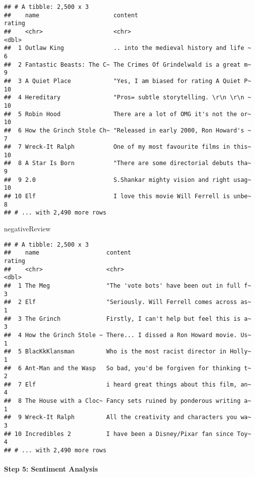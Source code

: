 \documentclass[]{article}
\newenvironment{Shaded}{\begin{snugshade}}{\end{snugshade}}
\newcommand{\NormalTok}[1]{#1}
\let\oldparagraph\paragraph
\renewcommand{\paragraph}[1]{\oldparagraph{#1}\mbox{}}
\begin{document}
\begin{verbatim}
## # A tibble: 2,500 x 3
##    name                     content                                 rating
##    <chr>                    <chr>                                    <dbl>
##  1 Outlaw King              .. into the medieval history and life ~      6
##  2 Fantastic Beasts: The C~ The Crimes Of Grindelwald is a great m~      9
##  3 A Quiet Place            "Yes, I am biased for rating A Quiet P~     10
##  4 Hereditary               "Pros= subtle storytelling. \r\n \r\n ~     10
##  5 Robin Hood               There are a lot of OMG it's not the or~     10
##  6 How the Grinch Stole Ch~ "Released in early 2000, Ron Howard's ~      7
##  7 Wreck-It Ralph           One of my most favourite films in this~     10
##  8 A Star Is Born           "There are some directorial debuts tha~      9
##  9 2.0                      S.Shankar mighty vision and right usag~     10
## 10 Elf                      I love this movie Will Ferrell is unbe~      8
## # ... with 2,490 more rows
\end{verbatim}

\begin{Shaded}
\begin{Highlighting}[]
\NormalTok{negativeReview}
\end{Highlighting}
\end{Shaded}

\begin{verbatim}
## # A tibble: 2,500 x 3
##    name                   content                                   rating
##    <chr>                  <chr>                                      <dbl>
##  1 The Meg                "The 'vote bots' have been out in full f~      3
##  2 Elf                    "Seriously. Will Ferrell comes across as~      1
##  3 The Grinch             Firstly, I can't help but feel this is a~      3
##  4 How the Grinch Stole ~ There... I dissed a Ron Howard movie. Us~      1
##  5 BlacKkKlansman         Who is the most racist director in Holly~      1
##  6 Ant-Man and the Wasp   So bad, you'd be forgiven for thinking t~      2
##  7 Elf                    i heard great things about this film, an~      4
##  8 The House with a Cloc~ Fancy sets ruined by ponderous writing a~      1
##  9 Wreck-It Ralph         All the creativity and characters you wa~      3
## 10 Incredibles 2          I have been a Disney/Pixar fan since Toy~      4
## # ... with 2,490 more rows
\end{verbatim}

\paragraph{Step 5: Sentiment Analysis}\label{step-5-sentiment-analysis}
\end{document}
